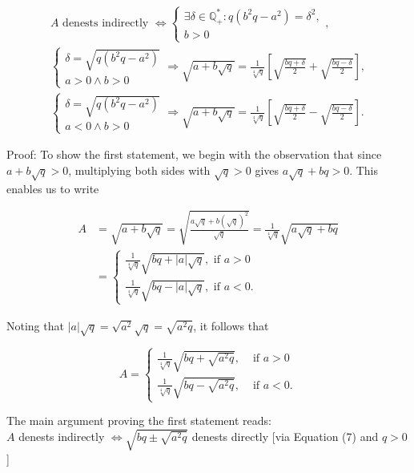 \documentclass[11pt,letterpaper]{article}
\begin{document}
\[
\begin{gathered}
A \text { denests indirectly } \Longleftrightarrow\left\{\begin{array}{l}
\exists \delta \in \mathbb{Q}_{+}^{*}: q\left(b^{2} q-a^{2}\right)=\delta^{2}, \\
b>0
\end{array},\right. \\
\left\{\begin{array}{l}
\delta=\sqrt{q\left(b^{2} q-a^{2}\right)} \\
a>0 \wedge b>0
\end{array} \Longrightarrow \sqrt{a+b \sqrt{q}}=\frac{1}{\sqrt[4]{q}}\left[\sqrt{\frac{b q+\delta}{2}}+\sqrt{\frac{b q-\delta}{2}}\right],\right. \\
\left\{\begin{array}{l}
\delta=\sqrt{q\left(b^{2} q-a^{2}\right)} \\
a<0 \wedge b>0
\end{array} \Longrightarrow \sqrt{a+b \sqrt{q}}=\frac{1}{\sqrt[4]{q}}\left[\sqrt{\frac{b q+\delta}{2}}-\sqrt{\frac{b q-\delta}{2}}\right] .\right.
\end{gathered}
\]

Proof: To show the first statement, we begin with the observation that since $a+b \sqrt{q}>0$, multiplying both sides with $\sqrt{q}>0$ gives $a \sqrt{q}+b q>0$. This enables us to write

\[
\begin{aligned}
A & =\sqrt{a+b \sqrt{q}}=\sqrt{\frac{a \sqrt{q}+b(\sqrt{q})^{2}}{\sqrt{q}}}=\frac{1}{\sqrt[4]{q}} \sqrt{a \sqrt{q}+b q} \\
& =\left\{\begin{array}{l}
\frac{1}{\sqrt[4]{q}} \sqrt{b q+|a| \sqrt{q}}, \text { if } a>0 \\
\frac{1}{\sqrt[4]{q}} \sqrt{b q-|a| \sqrt{q}}, \text { if } a<0 .
\end{array}\right.
\end{aligned}
\]

Noting that $|a| \sqrt{q}=\sqrt{a^{2}} \sqrt{q}=\sqrt{a^{2} q}$, it follows that

\[
A= \begin{cases}\frac{1}{\sqrt[4]{q}} \sqrt{b q+\sqrt{a^{2} q}}, & \text { if } a>0  \tag{7}\label{eq:7}\\ \frac{1}{\sqrt[4]{q}} \sqrt{b q-\sqrt{a^{2} q}}, & \text { if } a<0 .\end{cases}
\]

The main argument proving the first statement reads:\\
$A$ denests indirectly $\Longleftrightarrow \sqrt{b q \pm \sqrt{a^{2} q}}$ denests directly [via Equation (7) and $q>0$ ]
\end{document}
